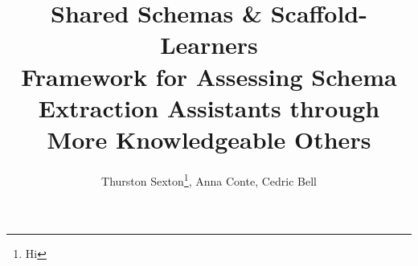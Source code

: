 \title[Shared Schemas \& Scaffold-Learners]{Shared Schemas \& Scaffold-Learners \\
{\large Framework for Assessing Schema Extraction Assistants through More Knowledgeable Others}}

\author{
    Thurston Sexton\footnote{Hi}, Anna Conte, Cedric Bell
}
%
%
%
%
%
\maketitle              %
%


